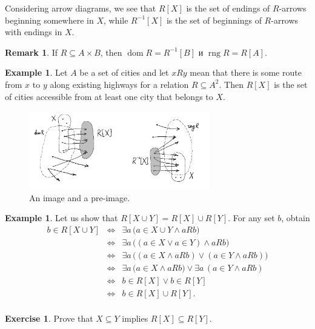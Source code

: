 \documentclass[12pt,notitlepage]{article}
\theoremstyle{plain}
\theoremstyle{definition}
\newtheorem{exc}[thm]{Exercise}
\newtheorem{exm}[thm]{Example}
\newtheorem{rem}[thm]{Remark}
\theoremstyle{plain}
\newcommand{\sbs}{\subseteq}
\newcommand{\dom}{\mathop{\mathrm{dom}}}
\newcommand{\rng}{\mathop{\mathrm{rng}}}
\newcommand{\1}{\mathbf{1}}
\newcommand{\0}{\mathbf{0}}
\begin{document}
Considering arrow diagrams, we see that $R[X]$ is the set of endings of $R$-arrows beginning somewhere in $X$, while $R^{-1}[X]$ is the set of beginnings of $R$-arrows with endings in $X$.

\begin{rem}
If $R \sbs A \times B$, then $\dom R = R^{-1}[B]$ и $\rng R = R[A]$.
\end{rem}

\begin{exm}
Let $A$ be a set of cities and let $xRy$ mean that there is some route from $x$ to $y$ along existing highways for a relation $R \sbs A^2$. Then $R[X]$ is the set of cities accessible from at least one city that belongs to $X$.
\end{exm}

\begin{figure}[h]
\centering
\includegraphics*[width=0.7\textwidth]{rel_img.pdf}
\caption{An image and a pre-image.}
\end{figure}

\begin{exm}
Let us show that $R[X \cup Y] = R[X] \cup R[Y]$.
For any set $b$, obtain
$$
\begin{array}{rcl}
b \in R[X \cup Y] &\iff& \exists a\, \bigl(a \in X \cup Y \wedge a R b \bigr)\\
&\iff& \exists a\, \bigl((a \in X \vee a \in Y) \wedge a R b \bigr)\\
&\iff& \exists a\, \bigl((a \in X \wedge a R b) \vee (a \in Y \wedge a R b)\bigr)\\
&\iff& \exists a\, \bigl(a \in X \wedge a R b) \vee \exists a\, (a \in Y \wedge a R b)\\
&\iff& b \in R[X] \vee b \in R[Y]\\
&\iff& b \in R[X] \cup R[Y].\\
\end{array}
$$
\end{exm}

\begin{exc}\label{ch0:img_monot}
Prove that $X \sbs Y$ implies $R[X] \sbs R[Y]$.
\end{exc}
\end{document}
